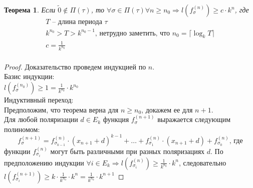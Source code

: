\documentclass[bibliography=totoc, a4paper, 14pt]{extarticle}
\newtheorem{myth}{Теорема}
\begin{document}
\begin{myth}
\label{th2}
Если $\tilde{0} \not\in \Pi(\tau)$, то $\forall \sigma \in \Pi(\tau) \forall n \geqslant n_0 \Rightarrow
l(f_{\sigma}^{(n)}) \geqslant c \cdot k^n$, где
$$
\begin{array}{l}
T \text{ -- длина периода }\tau \\
k^{n_0} > T > k^{n_0 - 1} \text{, нетрудно заметить, что } n_0 = \lceil \log_kT \rceil \\
c = \frac{1}{k^{n_0}} \\
\end{array}
$$
\end{myth}
\begin{proof}
Доказательство проведем индукцией по $n$. \\
Базис индукции: \\
$l(f_{\sigma}^{(n_0)}) \geqslant 1 = \frac{1}{k^{n_0}} \cdot k^{n_0}$ \\
Индуктивный переход:\\
Предположим, что теорема верна для $n \geqslant n_0$, докажем ее для $n+1$.\\
Для любой поляризации $d \in E_k$ функция $f_{\sigma}^{(n+1)}$ выражается следующим полиномом:
$$f_{\sigma}^{(n+1)} = f_{\sigma_{k-1}}^{(n)}\cdot(x_{n+1}+d)^{k-1} + \ldots +
f_{\sigma_1}^{(n)}\cdot(x_{n+1}+d) + f^{(n)}_{\sigma_0} \text{, где} $$
функции $f_{\sigma_i}^{(n)}$ могут быть различными при разных поляризациях $d$.
По предположению индукции $\forall i \in E_k \Rightarrow l(f_{\sigma_i}^{(n)}) \geqslant
\frac{1}{k^{n_0}} \cdot k^n$, следовательно $l(f_{\sigma_i}^{(n+1)}) \geqslant
k \cdot \frac{1}{k^{n_0}} \cdot k^n = \frac{1}{k^{n_0}} \cdot k^{n+1}$
\end{proof}
\end{document}
